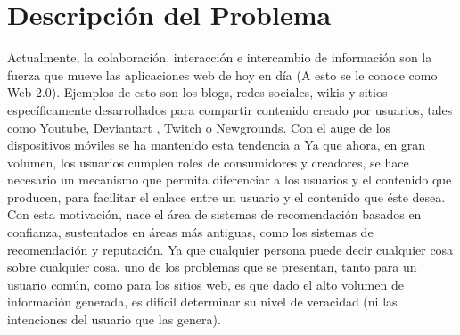 \section{Descripción del Problema}

Actualmente, la colaboración, interacción e intercambio de información son la fuerza que mueve las aplicaciones web de hoy en día (A esto se le conoce como Web 2.0).  Ejemplos de esto son los blogs, redes sociales, wikis y sitios específicamente desarrollados para compartir contenido creado por usuarios, tales como Youtube, Deviantart ,  Twitch o Newgrounds. 
Con el auge de los dispositivos móviles se ha mantenido esta tendencia a
Ya que ahora, en gran volumen, los usuarios cumplen roles de consumidores y creadores, se hace necesario un mecanismo que permita diferenciar a los usuarios y el contenido que producen, para facilitar el enlace entre un usuario y el contenido que éste desea.
Con esta motivación, nace el área de sistemas de recomendación basados en confianza, sustentados en áreas más antiguas, como los sistemas de recomendación y reputación.
Ya que cualquier persona puede decir cualquier cosa sobre cualquier cosa, uno de los problemas que se presentan, tanto para un usuario común, como para los sitios web, es que dado el alto volumen de información generada, es difícil determinar su nivel de veracidad (ni las intenciones del usuario que las genera).
